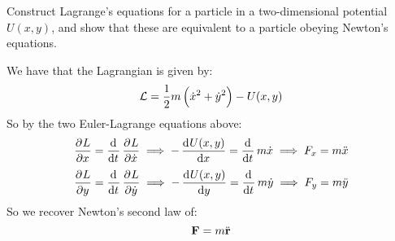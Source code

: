 \documentclass[../PHYS306Notes.tex]{subfiles}
\begin{document}
\begin{p}
Construct Lagrange’s equations for a particle in a two-dimensional potential $U(x,y)$, and show that these are equivalent to a particle obeying Newton’s equations.
\end{p}
\begin{s}
We have that the Lagrangian is given by:
\[\mathcal{L} = \frac{1}{2}m\left(\dot{x}^2+\dot{y}^2\right) - U(x,y)\]
So by the two Euler-Lagrange equations above:
\[\dpd{L}{x} = \dod{}{t}\dpd{L}{\dot{x}} \implies -\dod{U(x,y)}{x} = \dod{}{t}m\dot{x} \implies F_x = m \ddot{x} \]
\[\dpd{L}{y} = \dod{}{t}\dpd{L}{\dot{y}} \implies -\dod{U(x,y)}{y} = \dod{}{t}m\dot{y} \implies F_y = m \ddot{y} \]
So we recover Newton's second law of:
\[\mathbf{F} = m\ddot{\mathbf{r}}\]
\end{s}
\end{document}
